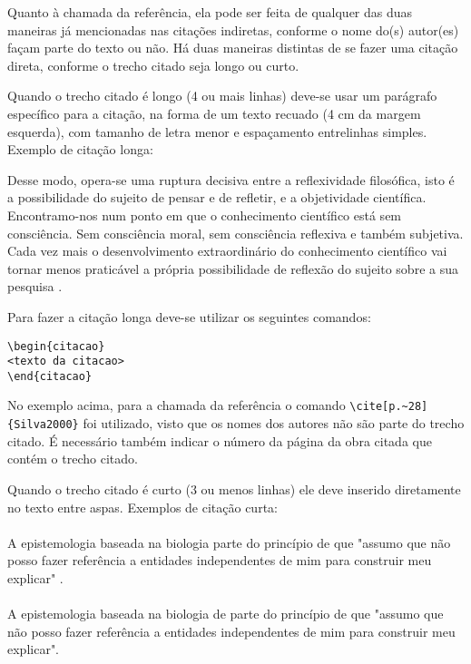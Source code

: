 Quanto à chamada da referência, ela pode ser feita de qualquer das duas maneiras já mencionadas nas citações indiretas, conforme o nome do(s) autor(es) façam parte do texto ou não. Há duas maneiras distintas de se fazer uma citação direta, conforme o trecho citado seja longo ou curto.

Quando o trecho citado é longo (4 ou mais linhas) deve-se usar um parágrafo específico para a citação, na forma de um texto recuado (4 cm da margem esquerda), com tamanho de letra menor e espaçamento entrelinhas simples. Exemplo de citação longa:
\\\begin{citacao}
    Desse modo, opera-se uma ruptura decisiva entre a reflexividade filosófica, isto é a possibilidade do sujeito de pensar e de refletir, e a objetividade científica. Encontramo-nos num ponto em que o conhecimento científico está sem consciência. Sem consciência moral, sem consciência reflexiva e também subjetiva. Cada vez mais o desenvolvimento extraordinário do conhecimento científico vai tornar menos praticável a própria possibilidade de reflexão do sujeito sobre a sua pesquisa \cite[p.~28]{Silva2000}.
\end{citacao}

Para fazer a citação longa deve-se utilizar os seguintes comandos:
\begin{verbatim}
\begin{citacao}
<texto da citacao>
\end{citacao}
\end{verbatim}

No exemplo acima, para a chamada da referência o comando \verb|\cite[p.~28]{Silva2000}| foi utilizado, visto que os nomes dos autores não são parte do trecho citado. É necessário também indicar o número da página da obra citada que contém o trecho citado.

Quando o trecho citado é curto (3 ou menos linhas) ele deve inserido diretamente no texto entre aspas. Exemplos de citação curta:\\
\\A epistemologia baseada na biologia parte do princípio de que "assumo que não posso fazer referência a entidades independentes de mim para construir meu explicar" \cite[p.~35]{Maturana2003}.\\
\\A epistemologia baseada na biologia de  parte do princípio de que "assumo que não posso fazer referência a entidades independentes de mim para construir meu explicar".

